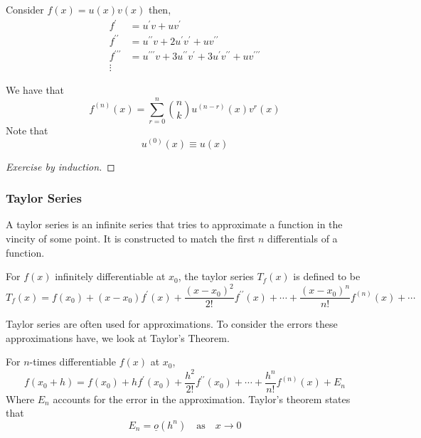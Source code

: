 \documentclass{article}
\begin{document}
\begin{thm}
    Consider $f(x) = u(x)v(x)$ then,
    \begin{align*}
        f^{\prime} &= u^{\prime}v + uv^{\prime} \\
        f^{\prime\prime} &= u^{\prime\prime}v + 2u^{\prime}v^{\prime} + uv^{\prime\prime} \\
        f^{\prime\prime\prime} &= u^{\prime\prime\prime}v + 3u^{\prime\prime}v^{\prime} + 3u^{\prime}v^{\prime\prime} + uv^{\prime\prime\prime} \\
        \vdots
    \end{align*}

    We have that
    \[
        f^{(n)}(x) = \sum_{r=0}^{n}{\binom{n}{k}u^{(n-r)}(x)v^{r}(x)}
    \]
    Note that
    \[
        u^{(0)}(x) \equiv u(x)  
    \]
\end{thm}

\begin{proof}[Exercise by induction]
    
\end{proof}

\subsubsection{Taylor Series}
A taylor series is an infinite series that tries to approximate a function in the vincity of some point. It is constructed to match the first $n$ differentials of a function.

\begin{defi}
    For $f(x)$ infinitely differentiable at $x_0$, the taylor series $T_f(x)$ is defined to be
    \[
        T_f(x) = f(x_0) + (x - x_0)f^{\prime}(x) + \frac{(x - x_0)^2}{2!}f^{\prime\prime}(x) + \cdots + \frac{(x - x_0)^n}{n!}f^{(n)}(x) + \cdots
    \]
\end{defi}

Taylor series are often used for approximations. To consider the errors these approximations have, we look at Taylor's Theorem.

\begin{thm}
    For $n$-times differentiable $f(x)$ at $x_0$,
    \[
        f(x_0 + h) = f(x_0) + hf^{\prime}(x_0) + \frac{h^2}{2!}f^{\prime\prime}(x_0) + \cdots + \frac{h^n}{n!}f^{(n)}(x) + E_n
    \]
    Where $E_n$ accounts for the error in the approximation. Taylor's theorem states that
    \[
        E_n = \underline{o}(h^n) \quad \text{as} \quad x \rightarrow 0  
    \]
\end{thm}
\end{document}
